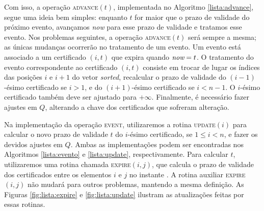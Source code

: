 Com isso, a operação \textsc{advance}$(t)$, implementada no
Algoritmo \ref{lista:advance}, segue uma ideia bem simples: enquanto
$t$ for maior que o prazo de validade do próximo evento, avançamos
\textit{now} para esse prazo de validade e tratamos esse evento. Nos
problemas seguintes, a operação \textsc{advance}$(t)$ será sempre a
mesma; as únicas mudanças ocorrerão no tratamento de um evento. Um
evento está associado a um certificado $(i, t)$ que expira quando
$\textit{now} = t$. O tratamento do evento correspondente ao certificado
$(i, t)$ consiste em trocar de lugar os índices das posições $i$ e
$i + 1$ do vetor \textit{sorted}, recalcular o prazo de validade do
$(i-1)$-ésimo certificado se $i > 1$, e do $(i + 1)$-ésimo
certificado se $i < n - 1$. O $i$-ésimo certificado também deve ser
ajustado para $+\infty$. Finalmente, é necessário fazer ajustes em
$Q$, alterando a chave dos certificados que sofreram alteração.



Na implementação da operação \textsc{event}, utilizaremos a rotina
\textsc{update}$(i)$ para calcular o novo prazo de validade $t$ do
$i$-ésimo certificado, se $1 \leq i < n$, e fazer os devidos ajustes
em $Q$. Ambas as implementações podem ser encontradas nos Algoritmos
\ref{lista:evento} e \ref{lista:update}, respectivamente. Para
calcular $t$, utilizaremos uma rotina chamada \textsc{expire}$(i,
j)$, que calcula o prazo de validade dos certificados entre os
elementos $i$ e $j$ no instante \now. A rotina auxiliar
\textsc{expire}$(i, j)$ não mudará para outros problemas, mantendo a
mesma definição. As Figuras \ref{fig:lista:expire} e
\ref{fig:lista:update} ilustram as atualizações feitas por essas
rotinas.













